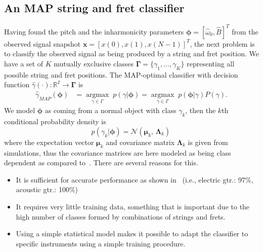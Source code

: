 \documentclass{article}
\begin{document}
\begin{sloppy}
\subsection{An MAP string and fret classifier}
Having found the pitch and the inharmonicity parameters $\boldsymbol{\phi} = [\widehat\omega_0, \widehat B ]^T$ from the observed signal snapshot $\mathbf{x} = [x(0), x(1), x(N-1)]^T$, the next problem is to classify the observed signal as being produced by a string and fret position. 
We have a set of $K$ mutually exclusive classes $\boldsymbol{\Gamma}=\{\gamma_1,\dots,\gamma_K\}$ representing all possible string and fret positions. The MAP-optimal classifier with decision function $\hat{\gamma}(\cdot): \mathbb{R}^I \rightarrow \boldsymbol{\Gamma}  $ is 
\begin{align}
    \hat\gamma_{{MAP}}(\boldsymbol{\phi}) &= \underset{\gamma\in\Gamma}{\operatorname{argmax}}\;{p(\gamma|\boldsymbol{\phi})} = \underset{\gamma\in\Gamma}{\operatorname{argmax}}\;{p(\boldsymbol{\phi}|\gamma)P(\gamma)}.
\end{align}
We model $\boldsymbol{\phi}$ as coming from a normal object with class $\gamma_k$, then the $k$th conditional probability density is   
\begin{equation}
    p(\gamma_k\lvert\boldsymbol{\phi}) =
    \mathcal{N}(\boldsymbol{\mu}_k,\,\boldsymbol{\Lambda}_k)\,
\end{equation}
where the expectation vector $\boldsymbol{\mu}_k$ and covariance matrix $\boldsymbol{ \Lambda }_k$ is given from simulations, thus the covariance matrices are here modeled as being class dependent as compared to~\cite{hjerrild::icassp19}. 
%
There are several reasons for this. 
\begin{itemize}
    \item It is sufficient for accurate performance as shown in~\cite{hjerrild::icassp19} (i.e., electric gtr.: 97\%, acoustic gtr.: 100\%)
    \item It requires very little training data, something that is important due to the high number of classes formed by combinations of strings and frets. 
    \item Using a simple statistical model makes it possible to adapt the classifier to specific instruments using a simple training procedure.
\end{itemize}

\end{sloppy}
\end{document}
